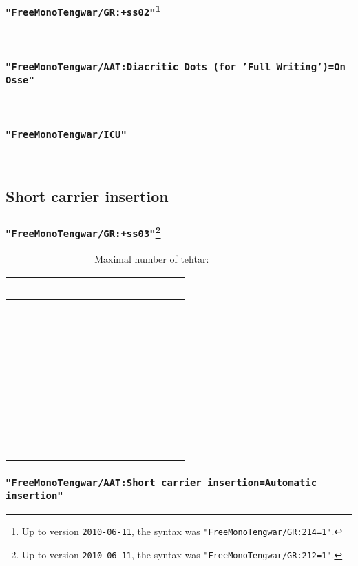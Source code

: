 \documentclass{article}
\begin{document}
\subsubsection*{\texttt{"FreeMonoTengwar/GR:+ss02"}\footnote{Up to version \texttt{2010-06-11}, the syntax was \texttt{"FreeMonoTengwar/GR:214=1"}.}}

\osseGR    

\subsubsection*{\texttt{"FreeMonoTengwar/AAT:Diacritic Dots (for 'Full Writing')=On Osse"}}

\osseAAT    

\subsubsection*{\texttt{"FreeMonoTengwar/ICU"}}

\freeICU     


\newpage

\subsection{Short carrier insertion}

\subsubsection*{\texttt{"FreeMonoTengwar/GR:+ss03"}\footnote{Up to version \texttt{2010-06-11}, the syntax was \texttt{"FreeMonoTengwar/GR:212=1"}.}}


\insertGR      \normalfont Maximal number of tehtar:
\insertGR  

\newcommand{\combinationsrow}[1]{#1 & #1 & #1 & #1 & #1 & #1 & #1 & #1 & #1 \\}

\begin{tabular}{ c | c c c c c c c c}
	\combinationsrow{} \hline
	\combinationsrow{}
	\combinationsrow{}
	\combinationsrow{}
	\combinationsrow{}
	\combinationsrow{}
	\combinationsrow{}
	\combinationsrow{}
	\combinationsrow{}
\end{tabular}

\subsubsection*{\texttt{"FreeMonoTengwar/AAT:Short carrier insertion=Automatic insertion"}}
\end{document}
